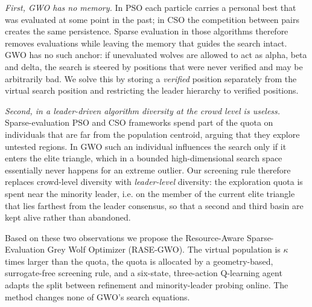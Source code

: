 \emph{First, GWO has no memory.} In PSO each particle carries a personal best
that was evaluated at some point in the past; in CSO the competition between
pairs creates the same persistence. Sparse evaluation in those algorithms
therefore removes evaluations while leaving the memory that guides the search
intact. GWO has no such anchor: if unevaluated wolves are allowed to act as
alpha, beta and delta, the search is steered by positions that were never
verified and may be arbitrarily bad. We solve this by storing a
\emph{verified} position separately from the virtual search position and
restricting the leader hierarchy to verified positions.

\emph{Second, in a leader-driven algorithm diversity at the crowd level is
useless.} Sparse-evaluation PSO and CSO frameworks spend part of the quota on
individuals that are far from the population centroid, arguing that they explore
untested regions. In GWO such an individual influences the search only if it
enters the elite triangle, which in a bounded high-dimensional search space
essentially never happens for an extreme outlier. Our screening rule therefore
replaces crowd-level diversity with \emph{leader-level} diversity: the
exploration quota is spent near the minority leader, i.e. on the member of the
current elite triangle that lies farthest from the leader consensus, so that a
second and third basin are kept alive rather than abandoned.

Based on these two observations we propose the Resource-Aware Sparse-Evaluation
Grey Wolf Optimizer (RASE-GWO). The virtual population is $\kappa$ times larger
than the quota, the quota is allocated by a geometry-based, surrogate-free
screening rule, and a six-state, three-action Q-learning agent adapts the split
between refinement and minority-leader probing online. The method changes none
of GWO's search equations.

